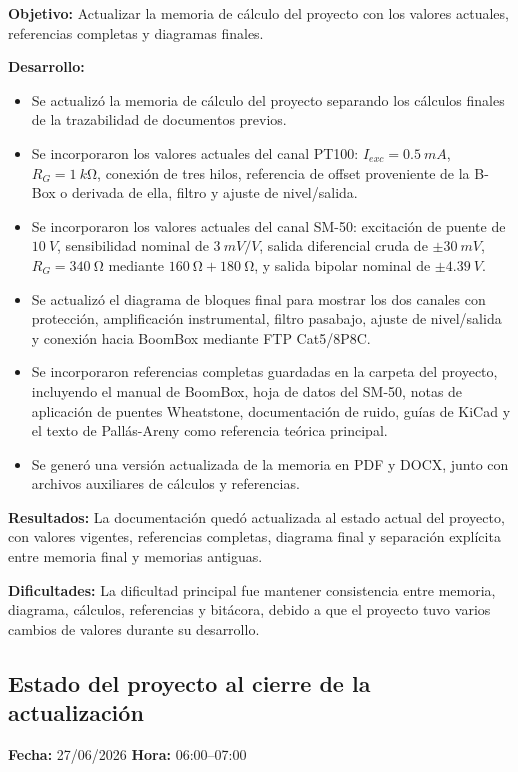 \documentclass[12pt]{article}
\begin{document}
\textbf{Objetivo:}
Actualizar la memoria de cálculo del proyecto con los valores actuales, referencias completas y diagramas finales.

\textbf{Desarrollo:}
\begin{itemize}
\item Se actualizó la memoria de cálculo del proyecto separando los cálculos finales de la trazabilidad de documentos previos.
\item Se incorporaron los valores actuales del canal PT100: \(I_{exc}=\SI{0.5}{mA}\), \(R_G=\SI{1}{k\ohm}\), conexión de tres hilos, referencia de offset proveniente de la B-Box o derivada de ella, filtro y ajuste de nivel/salida.
\item Se incorporaron los valores actuales del canal SM-50: excitación de puente de \(\SI{10}{V}\), sensibilidad nominal de \(\SI{3}{mV/V}\), salida diferencial cruda de \(\pm\SI{30}{mV}\), \(R_G=\SI{340}{\ohm}\) mediante \(\SI{160}{\ohm}+\SI{180}{\ohm}\), y salida bipolar nominal de \(\pm\SI{4.39}{V}\).
\item Se actualizó el diagrama de bloques final para mostrar los dos canales con protección, amplificación instrumental, filtro pasabajo, ajuste de nivel/salida y conexión hacia BoomBox mediante FTP Cat5/8P8C.
\item Se incorporaron referencias completas guardadas en la carpeta del proyecto, incluyendo el manual de BoomBox, hoja de datos del SM-50, notas de aplicación de puentes Wheatstone, documentación de ruido, guías de KiCad y el texto de Pallás-Areny como referencia teórica principal.
\item Se generó una versión actualizada de la memoria en PDF y DOCX, junto con archivos auxiliares de cálculos y referencias.
\end{itemize}

\textbf{Resultados:}
La documentación quedó actualizada al estado actual del proyecto, con valores vigentes, referencias completas, diagrama final y separación explícita entre memoria final y memorias antiguas.

\textbf{Dificultades:}
La dificultad principal fue mantener consistencia entre memoria, diagrama, cálculos, referencias y bitácora, debido a que el proyecto tuvo varios cambios de valores durante su desarrollo.

\subsection{Estado del proyecto al cierre de la actualización}
\textbf{Fecha:} 27/06/2026 \quad \textbf{Hora:} 06:00--07:00
\end{document}
